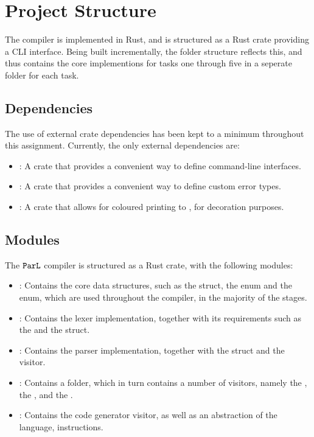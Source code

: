 \section{Project Structure}

The  compiler is implemented in Rust, and is structured as a Rust
crate providing a CLI interface. Being built incrementally, the folder structure reflects this, and thus contains the core implementions for tasks one through five in a seperate folder for each task.

\subsection{Dependencies}

The use of external crate dependencies has been kept to a minimum throughout
this assignment. Currently, the only external dependencies are:

\begin{itemize}

      \item {}: A crate that provides a convenient way to define
            command-line interfaces.

      \item {}: A crate that provides a convenient way to define
            custom error types.

      \item {}: A crate that allows for coloured printing to , for decoration purposes.
\end{itemize}

\subsection{Modules}

The $\texttt{ParL}$ compiler is structured as a Rust crate, with the following
modules:

\begin{itemize}
      \item {}: Contains the core data structures, such as the
             struct, the  enum and the  enum,
            which are used throughout the compiler, in the majority of the stages.
      \item {}: Contains the lexer implementation, together with its
            requirements such as the  and the  struct.
      \item
            : Contains the parser implementation, together with the
             struct and the  visitor.
      \item {}: Contains a  folder, which
            in turn contains a number of visitors, namely the , the , and the .
      \item {}: Contains the  code generator visitor,
            as well as an abstraction of the  language, instructions.
\end{itemize}

